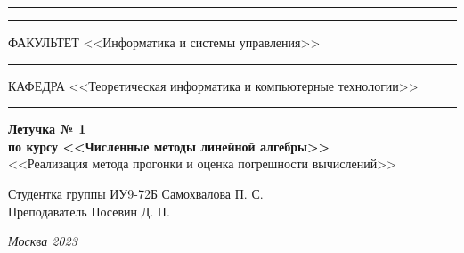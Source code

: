 \documentclass[a4paper, 14pt]{extarticle}
\begin{document}
\begin{titlepage}
\vspace{-25pt}
\hspace{-35pt}\rule{\textwidth}{2.3pt}

\vspace*{-20.3pt}
\hspace{-35pt}\rule{\textwidth}{0.4pt}

\vspace{1.5ex}
\hspace{-35pt} \noindent \small ФАКУЛЬТЕТ\hspace{80pt} <<Информатика и системы управления>>

\vspace*{-16pt}
\hspace{47pt}\rule{0.83\textwidth}{0.4pt}

\vspace{0.5ex}
\hspace{-35pt} \noindent \small КАФЕДРА\hspace{50pt} <<Теоретическая информатика и компьютерные технологии>>

\vspace*{-16pt}
\hspace{30pt}\rule{0.866\textwidth}{0.4pt}
  
\vspace{11em}

\begin{center}
\Large {\bf Летучка № 1} \\
\large {\bf по курсу <<Численные методы линейной алгебры>>} \\
\large <<Реализация метода прогонки и оценка погрешности вычислений>>
\end{center}\normalsize

\vspace{8em}


\begin{flushright}
  {Студентка группы ИУ9-72Б Самохвалова П. С. \hspace*{15pt}\\
  \vspace{2ex}
  Преподаватель Посевин Д. П.\hspace*{15pt}}
\end{flushright}

\bigskip

\vfill
 

\begin{center}
\textsl{Москва 2023}
\end{center}
\end{titlepage}
\end{document}
